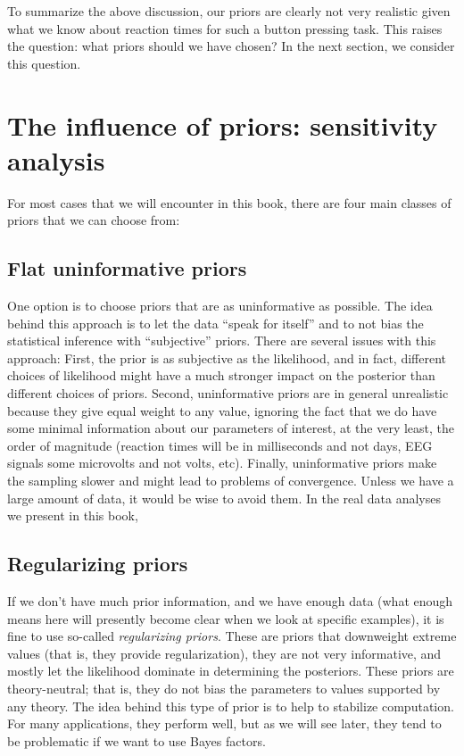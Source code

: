 \documentclass[12pt,]{krantz}
\theoremstyle{definition}
\theoremstyle{definition}
\theoremstyle{definition}
\theoremstyle{remark}
\begin{document}
To summarize the above discussion, our priors are clearly not very realistic given what we know about reaction times for such a button pressing task. This raises the question: what priors should we have chosen? In the next section, we consider this question.

\hypertarget{sec:sensitivity}{%
\section{The influence of priors: sensitivity analysis}\label{sec:sensitivity}}

For most cases that we will encounter in this book, there are four main classes of priors that we can choose from:

\hypertarget{flat-uninformative-priors}{%
\subsection{Flat uninformative priors}\label{flat-uninformative-priors}}

One option is to choose priors that are as uninformative as possible. The idea behind this approach is to let the data ``speak for itself'' and to not bias the statistical inference with ``subjective'' priors. There are several issues with this approach: First, the prior is as subjective as the likelihood, and in fact, different choices of likelihood might have a much stronger impact on the posterior than different choices of priors. Second, uninformative priors are in general unrealistic because they give equal weight to any value, ignoring the fact that we do have some minimal information about our parameters of interest, at the very least, the order of magnitude (reaction times will be in milliseconds and not days, EEG signals some microvolts and not volts, etc). Finally, uninformative priors make the sampling slower and might lead to problems of convergence. Unless we have a large amount of data, it would be wise to avoid them. In the real data analyses we present in this book,

\hypertarget{regularizing-priors}{%
\subsection{Regularizing priors}\label{regularizing-priors}}

If we don't have much prior information, and we have enough data (what enough means here will presently become clear when we look at specific examples), it is fine to use so-called \emph{regularizing priors}. These are priors that downweight extreme values (that is, they provide regularization), they are not very informative, and mostly let the likelihood dominate in determining the posteriors. These priors are theory-neutral; that is, they do not bias the parameters to values supported by any theory. The idea behind this type of prior is to help to stabilize computation. For many applications, they perform well, but as we will see later, they tend to be problematic if we want to use Bayes factors.
\end{document}
